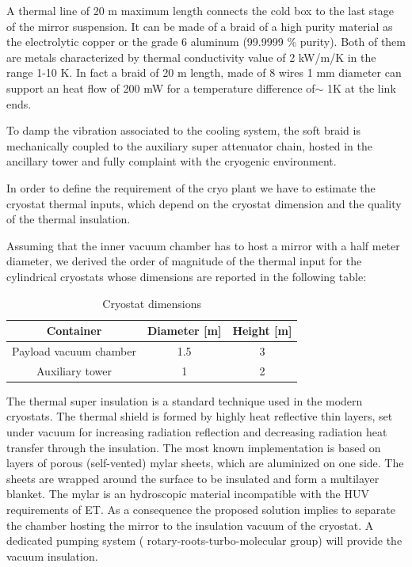 A  thermal line of 20 m maximum length connects the cold box to the last stage of the mirror suspension. It can be made of a  braid  of a high purity material as the electrolytic copper or the grade 6 aluminum (99.9999 \% purity). Both of them  are metals characterized by  thermal conductivity value of 2 kW/m/K in the range 1-10 K. In fact  a braid of   20 m length, made of 8 wires 1 mm diameter can support an heat flow of 200 mW for a temperature  difference  of$\sim$ 1K at the link ends.

To damp the vibration associated  to the cooling system, the soft braid is mechanically coupled to the auxiliary super attenuator chain, hosted in the ancillary tower and   fully complaint with the cryogenic environment. 


In order to define the requirement of  the cryo plant  we have to estimate the cryostat thermal inputs, which depend on the cryostat dimension and the quality of the thermal insulation. 

\noindent
Assuming  that the inner vacuum chamber has to host a mirror with a half meter diameter, we derived the order of magnitude of the thermal input  for the cylindrical cryostats whose dimensions are reported  in the following table:
\begin{table}[htp]
\caption{Cryostat dimensions}
\begin{center}
\begin{tabular}{|c|c|c|}
\hline
\hline
 Container & Diameter [m] & Height [m]\\
\hline
Payload vacuum chamber & 1.5 & 3  \\
Auxiliary tower  & 1 & 2 \\
\hline
\hline
\end{tabular}
\end{center}
\label{tab:cryostat_dimension}
\end{table}

 The thermal super insulation is a standard technique used in the modern cryostats.  The thermal  shield is formed by  highly heat reflective thin layers, set under vacuum  for increasing radiation reflection and decreasing radiation heat transfer through the insulation.  The  most known  implementation   is based on layers  of porous (self-vented) mylar  sheets, which are  aluminized on one side. The sheets are wrapped around the surface to be insulated and  form  a multilayer blanket. 
The mylar is an hydroscopic material incompatible with the HUV requirements of ET. As a consequence the proposed solution implies to  separate the chamber hosting the mirror to the insulation vacuum of the cryostat.   A dedicated pumping system ( rotary-roots-turbo-molecular group) will provide the vacuum insulation.  

